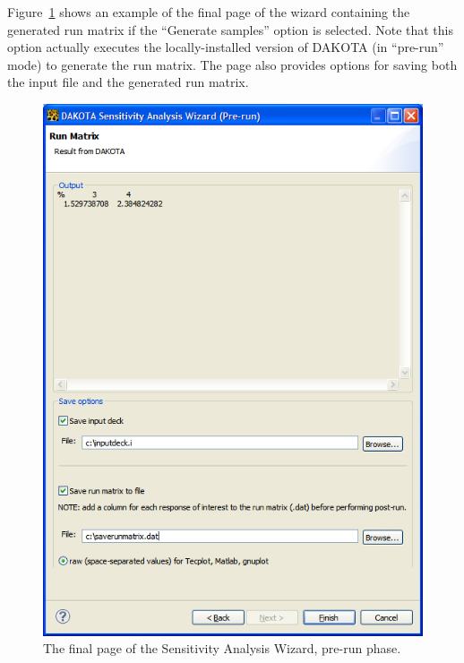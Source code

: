 Figure~\ref{fig:input:jag_wizard4} shows an example of the final page
of the wizard containing the generated run matrix if the ``Generate
samples'' option is selected.  Note that this option actually executes
the locally-installed version of DAKOTA (in ``pre-run'' mode) to
generate the run matrix.  The page also provides options for saving
both the input file and the generated run matrix.
\begin{figure}
  \centering
  \includegraphics[scale=0.5]{images/jag_wizard4}
  \caption{The final page of the Sensitivity Analysis Wizard, pre-run
  phase.}
  \label{fig:input:jag_wizard4}
\end{figure}


